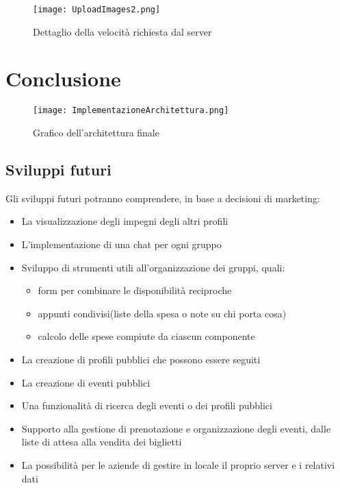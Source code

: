 \begin{figure}[htbp]
    \begin{center}
        \texttt{[image: UploadImages2.png]}
        \caption{Dettaglio della velocità richiesta dal server}
    \end{center}
\end{figure}


\clearpage
\chapter*{Conclusione}

\begin{figure}[htbp]
    \begin{center}
        \texttt{[image: ImplementazioneArchitettura.png]}
        \caption{Grafico dell'architettura finale}
    \end{center}
\end{figure}
\clearpage

\section{Sviluppi futuri}
Gli sviluppi futuri potranno comprendere, in base a decisioni di marketing:
\begin{itemize}
    \item La visualizzazione degli impegni degli altri profili
    \item L'implementazione di una chat per ogni gruppo
    \item Sviluppo di strumenti utili all'organizzazione dei gruppi, quali:
          \begin{itemize}
              \item form per combinare le disponibilità reciproche
              \item appunti condivisi(liste della spesa o note su chi porta cosa)
              \item calcolo delle spese compiute da ciascun componente
          \end{itemize}
    \item La creazione di profili pubblici che possono essere seguiti
    \item La creazione di eventi pubblici
    \item Una funzionalità di ricerca degli eventi o dei profili pubblici
    \item Supporto alla gestione di prenotazione e organizzazione degli eventi, dalle liste di attesa alla vendita dei biglietti
    \item La possibilità per le aziende di gestire in locale il proprio server e i relativi dati
\end{itemize}
\clearpage

